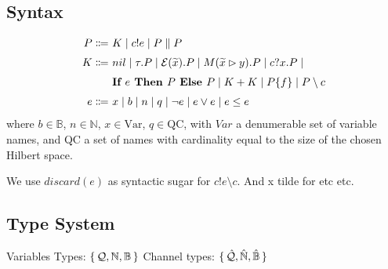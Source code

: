 \subsection{Syntax}

\begin{align*}
  P \Coloneqq &\ K \mid c!e 
  \mid P \parallel P \\[0.1cm]
  K \Coloneqq &\ nil \mid \tau . P \mid \mathcal{E}(\widetilde{x}) . P \mid M(\widetilde{x} \rhd y) . P \mid c?x . P \mid \\[0.1cm]
  &\ \textbf{If }{e}\textbf{ Then } {P} \textbf{ Else } {P} \mid K + K \mid P \{f\} \mid P \setminus c \\[0.1cm]
  e \Coloneqq &\ x \mid b \mid n \mid q \mid \neg e \mid e \lor e \mid e \leq e
\end{align*}	
where $b \in \mathbb{B}$, $n \in \mathbb{N}$, $x \in \text{Var}$, $q \in \text{QC}$, with $Var$ a denumerable set of variable names, and
QC a set of names with cardinality equal to the size of the chosen Hilbert space.

We use $discard(e)$ as syntactic sugar for $c!e \setminus c$. And x tilde for etc etc.

\subsection{Type System}

Variables Types: $\set{\mathcal{Q}, \mathbb{N}, \mathbb{B}}$
Channel types: $\set{\hat{\mathcal{Q}}, \hat{\mathbb{N}}, \hat{\mathbb{B}}}$

